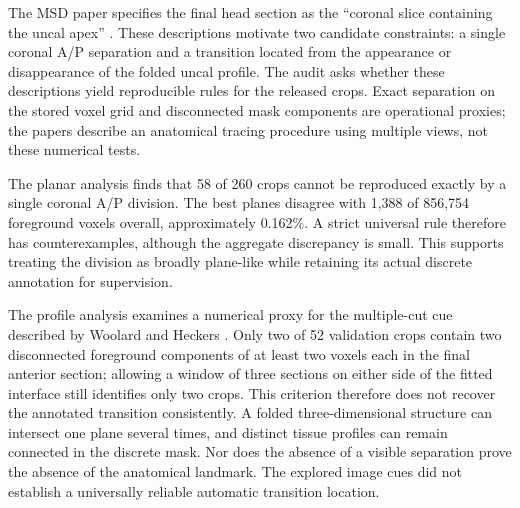 \documentclass[12pt,a4paper]{article}
\begin{document}
The MSD paper specifies the final head section as the ``coronal slice
containing the uncal apex'' \cite{simpson2019dataset}. These descriptions
motivate two candidate constraints: a single coronal A/P separation and
a transition located from the appearance or disappearance of the folded
uncal profile. The audit asks whether these descriptions yield
reproducible rules for the released crops. Exact separation on the stored
voxel grid and disconnected mask components are operational proxies;
the papers describe an anatomical tracing procedure using multiple
views, not these numerical tests.

The planar analysis finds that 58 of 260 crops cannot be reproduced
exactly by a single coronal A/P division. The best planes disagree
with 1,388 of 856,754 foreground voxels overall, approximately
0.162\%. A strict universal rule therefore has counterexamples,
although the aggregate discrepancy is small. This supports treating
the division as broadly plane-like while retaining its actual discrete
annotation for supervision.

The profile analysis examines a numerical proxy for the multiple-cut
cue described by Woolard and Heckers \cite{woolard2012asymmetry}.
Only two of 52 validation crops contain two disconnected foreground
components of at least two voxels each in the final anterior section;
allowing a window of three sections on either side of the fitted
interface still identifies only two crops. This criterion therefore
does not recover the annotated transition consistently. A folded
three-dimensional structure can intersect one plane several times,
and distinct tissue profiles can remain connected in the discrete mask.
Nor does the absence of a visible separation prove the absence of the
anatomical landmark. The explored image cues did not establish a
universally reliable automatic transition location.
\end{document}
